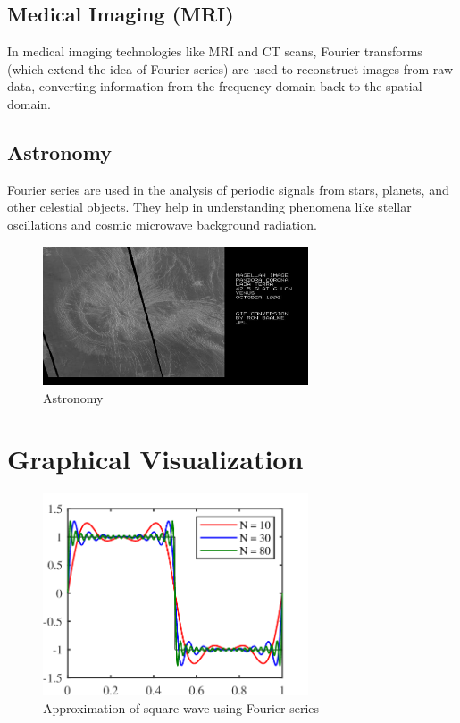 \documentclass[12pt,a4paper]{article}
\begin{document}
\subsection{Medical Imaging (MRI)}
In medical imaging technologies like MRI and CT scans, Fourier transforms (which extend the idea of Fourier series) are used to reconstruct images from raw data, converting information from the frequency domain back to the spatial domain.


\subsection{Astronomy}
Fourier series are used in the analysis of periodic signals from stars, planets, and other celestial objects. They help in understanding phenomena like stellar oscillations and cosmic microwave background radiation.

\begin{figure}[H]
    \centering
    \includegraphics[width=0.7\textwidth]{Astronomy}
    \caption{Astronomy}
\end{figure}



\section{Graphical Visualization}
\begin{figure}[H]
    \centering
    \includegraphics[width=0.7\textwidth]{fourier_square_wave}
    \caption{Approximation of square wave using Fourier series}
\end{figure}
\end{document}
